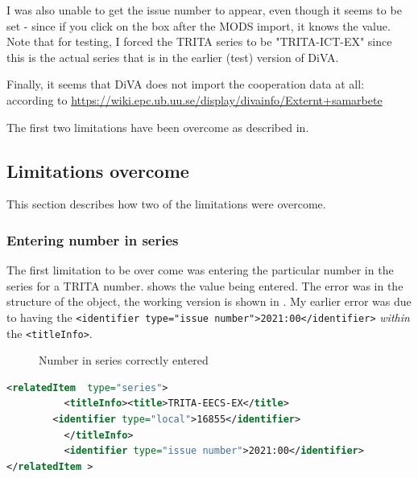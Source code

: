 I was also unable to get the issue number to appear, even though it seems to be set - since if you click on the box after the MODS import, it knows the value.  Note that for testing, I forced the TRITA series to be "TRITA-ICT-EX" since this is the actual series that is in the earlier (test) version of DiVA.

Finally, it seems that DiVA does not import the cooperation data at all: according to \url{https://wiki.epc.ub.uu.se/display/divainfo/Externt+samarbete}

The first two limitations have been overcome as described in\linebreak[4] .

\subsection{Limitations overcome}
\label{sec:limitationsOvercome}
This section describes how two of the limitations were overcome.

\subsubsection{Entering number in series}
The first limitation to be over come was entering the particular number in the series for a TRITA number.  shows the value being entered. The error was in the structure of the object, the working version is shown in . My earlier error was due to having the \texttt{<identifier type="issue number">2021:00</identifier>} \textit{within} the \texttt{<titleInfo>}.
 
 
\begin{figure}[!ht]
  \begin{center}
  \end{center}
  \caption{Number in series correctly entered}
  \label{fig:numberInSeriesCorrectlyEntered}
\end{figure}
\begin{lstlisting}[language={XML}, caption={MODS data for series}, label=lst:seriesNumber]
<relatedItem  type="series">
	      <titleInfo><title>TRITA-EECS-EX</title>
		<identifier type="local">16855</identifier>
	      </titleInfo>
	      <identifier type="issue number">2021:00</identifier>
</relatedItem >
\end{lstlisting}

